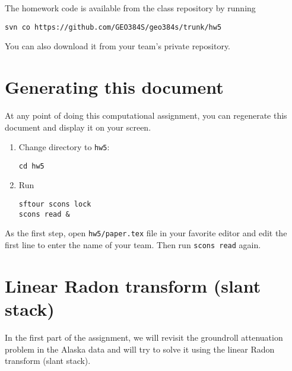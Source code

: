 The homework code is available from the class repository
by running
\begin{verbatim}
svn co https://github.com/GEO384S/geo384s/trunk/hw5
\end{verbatim}
You can also download it from your team's private repository.

\section{Generating this document}

At any point of doing this computational assignment, you can
regenerate this document and display it on your screen.

\begin{enumerate}          
\item Change directory to \texttt{hw5}:
\begin{verbatim}
cd hw5
\end{verbatim}
\item Run
\begin{verbatim}
sftour scons lock
scons read &
\end{verbatim}
\end{enumerate}

As the first step, open \texttt{hw5/paper.tex} file in your favorite
editor and edit the first line to enter the name of your team. Then
run \texttt{scons read} again.

\section{Linear Radon transform (slant stack)}

In the first part of the assignment, we will revisit the groundroll
attenuation problem in the Alaska data and will try to solve it using
the linear Radon transform (slant stack).

